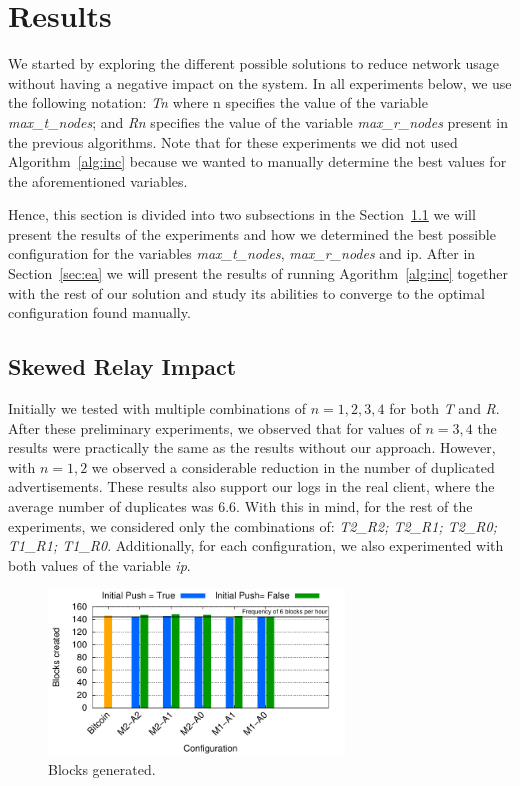 \section{Results}
\label{sec:results}
We started by exploring the different possible solutions to reduce network usage without having a negative impact on the system. In all experiments below, we use the following notation: \textsl{Tn} where n specifies the value of the variable \textsl{max\_t\_nodes}; and \textsl{Rn} specifies the value of the variable \textsl{max\_r\_nodes} present in the previous algorithms. Note that for these experiments we did not used Algorithm~\ref{alg:inc} because we wanted to manually determine the best values for the aforementioned variables.

Hence, this section is divided into two subsections in the Section~\ref{sec:sri} we will present the results of the experiments and how we determined the best possible configuration for the variables \textsl{max\_t\_nodes}, \textsl{max\_r\_nodes} and \acrshort{ip}. After in Section~\ref{sec:ea} we will present the results of running Agorithm~\ref{alg:inc} together with the rest of our solution and study its abilities to converge to the optimal configuration found manually.

\subsection{Skewed Relay Impact}
\label{sec:sri}
Initially we tested with multiple combinations of $n={1,2,3,4}$ for both \textsl{T} and \textsl{R}. After these preliminary experiments, we observed that for values of $n={3,4}$ the results were practically the same as the results without our approach. However, with $n={1,2}$ we observed a considerable reduction in the number of duplicated advertisements.
These results also support our logs in the real client, where the average number of duplicates was 6.6. With this in mind, for the rest of the experiments, we considered only the combinations of: \textsl{T2\_R2; T2\_R1; T2\_R0; T1\_R1; T1\_R0}. Additionally, for each configuration, we also experimented with both values of the variable \textsl{\acrshort{ip}}.

\begin{figure}[h]
\centering
\includegraphics[width=0.7\textwidth]{plots/blocks-gen.pdf}
\caption{Blocks generated.}
\label{fig:nb-blocks}
\end{figure}

